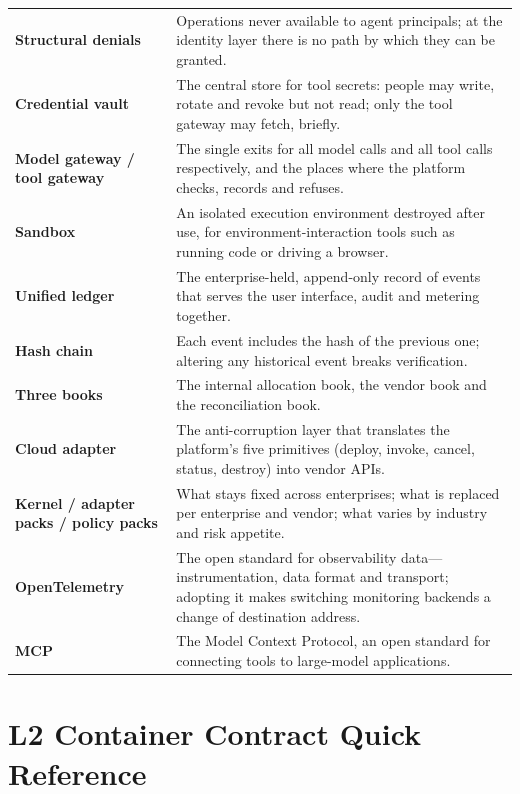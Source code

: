 \begin{longtable}{@{}>{\bfseries}L{3.9cm}L{\dimexpr\textwidth-3.9cm-2\tabcolsep\relax}@{}}
  Structural denials & Operations never available to agent principals; at the identity layer there is no path by which they can be granted.\\
  Credential vault & The central store for tool secrets: people may write, rotate and revoke but not read; only the tool gateway may fetch, briefly.\\
  Model gateway / tool gateway & The single exits for all model calls and all tool calls respectively, and the places where the platform checks, records and refuses.\\
  Sandbox & An isolated execution environment destroyed after use, for environment-interaction tools such as running code or driving a browser.\\
  Unified ledger & The enterprise-held, append-only record of events that serves the user interface, audit and metering together.\\
  Hash chain & Each event includes the hash of the previous one; altering any historical event breaks verification.\\
  Three books & The internal allocation book, the vendor book and the reconciliation book.\\
  Cloud adapter & The anti-corruption layer that translates the platform's five primitives (deploy, invoke, cancel, status, destroy) into vendor APIs.\\
  Kernel / adapter packs / policy packs & What stays fixed across enterprises; what is replaced per enterprise and vendor; what varies by industry and risk appetite.\\
  OpenTelemetry & The open standard for observability data---instrumentation, data format and transport; adopting it makes switching monitoring backends a change of destination address.\\
  MCP & The Model Context Protocol, an open standard for connecting tools to large-model applications.\\
  \bottomrule
\end{longtable}

\section{L2 Container Contract Quick Reference}
\label{app:l2}

